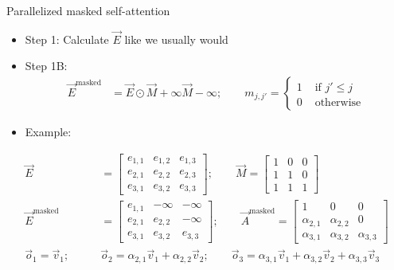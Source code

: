 \documentclass[11pt,compress,t,notes=noshow, xcolor=table]{beamer}
\begin{document}
\begin{vbframe}{Parallelized masked self-attention}

\vfill

\begin{itemize}
\item Step 1: Calculate $\vec E$ like we usually would
\item Step 1B:
$$
\begin{aligned}
\vec E^\mathrm{masked} & = \vec E \odot \vec M + \infty\vec M-\infty; \qquad m_{j,j'} = \begin{cases} 1 & \text{ if } j' \leq j \\ 0 & \text{ otherwise} \end{cases}
\end{aligned}
$$
\item Example:
\end{itemize}
$$
\begin{aligned}
\vec E & = \begin{bmatrix} e_{1,1} & e_{1,2} & e_{1,3} \\ e_{2,1} & e_{2,2} & e_{2,3} \\ e_{3,1} & e_{3,2} & e_{3,3} \end{bmatrix}; \qquad \vec M = \begin{bmatrix} 1 & 0 & 0 \\ 1 & 1 & 0 \\ 1 & 1 & 1 \end{bmatrix} \\
\vec E^\mathrm{masked} & = \begin{bmatrix} e_{1,1} & -\infty & -\infty \\ e_{2,1} & e_{2,2} & -\infty \\ e_{3,1} & e_{3,2} & e_{3,3} \end{bmatrix} ; \qquad \vec A^\mathrm{masked} = \begin{bmatrix} 1 & 0 & 0 \\ \alpha_{2,1} & \alpha_{2,2} & 0 \\ \alpha_{3,1} & \alpha_{3,2} & \alpha_{3,3} \end{bmatrix} \\
\vec o_1 = \vec v_1; \qquad & \vec o_2 = \alpha_{2,1} \vec v_1 + \alpha_{2,2} \vec v_2; \qquad \vec o_3 = \alpha_{3,1} \vec v_1 + \alpha_{3,2} \vec v_2 + \alpha_{3,3} \vec v_3
\end{aligned}
$$

\vfill

\end{vbframe}
\end{document}
